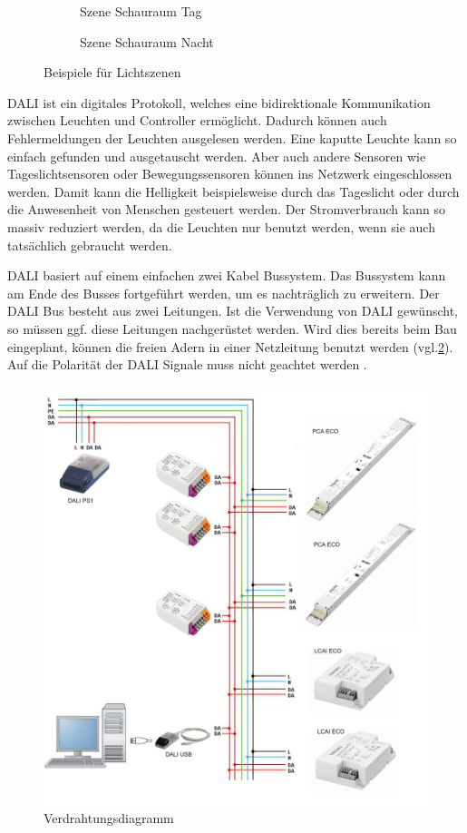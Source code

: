 \begin{figure}[H]
	\centering
	\begin{subfigure}{.5\textwidth}
		\centering
		\caption{Szene Schauraum Tag}
	\end{subfigure}%
	\begin{subfigure}{.5\textwidth}
		\centering
		\caption{Szene Schauraum Nacht}
	\end{subfigure}
	\caption{Beispiele für Lichtszenen \cite[S.6]{DALI_Handbuch}}
	\label{fig:dali_scenes}
\end{figure}

DALI ist ein digitales Protokoll, welches eine bidirektionale Kommunikation zwischen Leuchten und Controller ermöglicht\cite[S.1]{DALI-Lichtmanagement}. Dadurch können auch Fehlermeldungen der Leuchten ausgelesen werden. Eine kaputte Leuchte kann so einfach gefunden und ausgetauscht werden.  Aber auch andere Sensoren wie Tageslichtsensoren oder Bewegungssensoren können ins Netzwerk eingeschlossen werden\cite[S.3]{DALI_Handbuch}. Damit kann die Helligkeit beispielsweise durch das Tageslicht oder durch die Anwesenheit von Menschen gesteuert werden. Der Stromverbrauch kann so massiv reduziert werden, da die Leuchten nur benutzt werden, wenn sie auch tatsächlich gebraucht werden.

DALI basiert auf einem einfachen zwei Kabel Bussystem\cite[S.5]{DALI_Handbuch}. Das Bussystem kann am Ende des Busses fortgeführt werden, um es nachträglich zu erweitern. Der DALI Bus besteht aus zwei Leitungen. Ist die Verwendung von DALI gewünscht, so müssen ggf. diese Leitungen nachgerüstet werden. Wird dies bereits beim Bau eingeplant, können die freien Adern in einer Netzleitung benutzt werden\cite[S. c.3.2.2]{DALI-Lichtmanagement} (vgl.\ref{fig:wiring diagram}). Auf die Polarität der DALI Signale muss nicht geachtet werden \cite[p.3]{DALI_Handbuch}.

\begin{figure}[H]
	\centering
	\includegraphics[width=.6\linewidth]{Pictures/DaliInstallation}
	\caption{Verdrahtungsdiagramm \cite[S.64]{DALI_Handbuch}}
	\label{fig:wiring diagram}
\end{figure}

